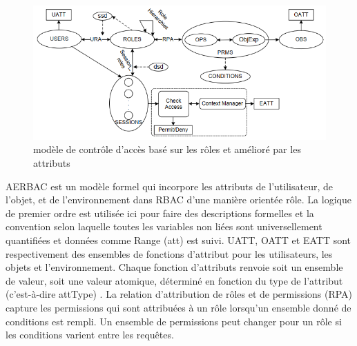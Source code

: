 

\begin{figure}[h!]
    \centering
		\includegraphics[scale=0.7]{chap2/images/aerbac.png}
    \caption{modèle de contrôle d'accès basé sur les rôles et amélioré par les attributs}
	 \label{figAERBAC}
\end{figure}

\label{sectionModèleAEBAC}

AERBAC est un modèle formel qui incorpore les attributs de l'utilisateur, de l'objet, et de l'environnement dans RBAC d'une manière orientée rôle. La logique de premier ordre est utilisée ici pour faire des descriptions formelles et la convention selon laquelle toutes les variables non liées sont universellement quantifiées et données comme Range (att) est suivi. UATT, OATT et EATT sont respectivement des ensembles de fonctions d'attribut pour les utilisateurs, les objets et l'environnement. Chaque fonction d'attributs renvoie soit un ensemble de valeur, soit une valeur atomique, déterminé en fonction du type de l'attribut (c'est-à-dire attType) \cite{rajpoot15}. 
La relation d'attribution de rôles et de permissions (RPA) capture les permissions qui sont attribuées à un rôle lorsqu'un ensemble donné de conditions est rempli. Un ensemble de permissions peut changer pour un rôle si les conditions varient entre les requêtes. 


